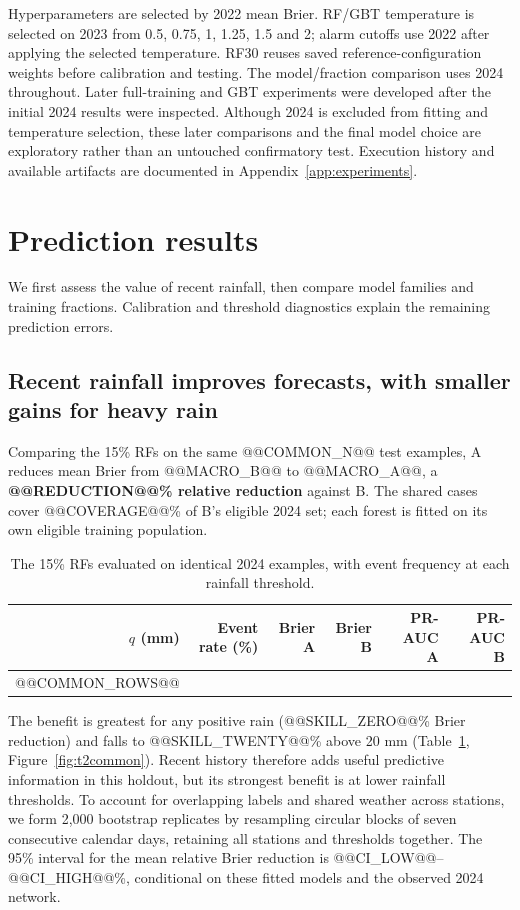Hyperparameters are selected by 2022 mean Brier. RF/GBT temperature is selected on 2023 from 0.5, 0.75, 1, 1.25, 1.5 and 2; alarm cutoffs use 2022 after applying the selected temperature. RF30 reuses saved reference-configuration weights before calibration and testing. The model/fraction comparison uses 2024 throughout. Later full-training and GBT experiments were developed after the initial 2024 results were inspected. Although 2024 is excluded from fitting and temperature selection, these later comparisons and the final model choice are exploratory rather than an untouched confirmatory test. Execution history and available artifacts are documented in Appendix~\ref{app:experiments}.

\clearpage
\section{Prediction results}
We first assess the value of recent rainfall, then compare model families and training fractions. Calibration and threshold diagnostics explain the remaining prediction errors.

\subsection{Recent rainfall improves forecasts, with smaller gains for heavy rain}

Comparing the 15\% RFs on the same @@COMMON_N@@ test examples, A reduces mean Brier from @@MACRO_B@@ to @@MACRO_A@@, a \textbf{@@REDUCTION@@\% relative reduction} against B. The shared cases cover @@COVERAGE@@\% of B's eligible 2024 set; each forest is fitted on its own eligible training population.
\par
\begin{table}[!ht]\centering\small
\begin{tabular}{rrrrrr}\toprule
$q$ (mm) & Event rate (\%) & Brier A & Brier B & PR-AUC A & PR-AUC B\\\midrule
@@COMMON_ROWS@@
\bottomrule
\end{tabular}
\caption{The 15\% RFs evaluated on identical 2024 examples, with event frequency at each rainfall threshold.}\label{tab:t2common}
\end{table}
\par
The benefit is greatest for any positive rain (@@SKILL_ZERO@@\% Brier reduction) and falls to @@SKILL_TWENTY@@\% above 20 mm (Table~\ref{tab:t2common}, Figure~\ref{fig:t2common}). Recent history therefore adds useful predictive information in this holdout, but its strongest benefit is at lower rainfall thresholds.
To account for overlapping labels and shared weather across stations, we form 2,000 bootstrap replicates by resampling circular blocks of seven consecutive calendar days, retaining all stations and thresholds together. The 95\% interval for the mean relative Brier reduction is @@CI_LOW@@--@@CI_HIGH@@\%, conditional on these fitted models and the observed 2024 network.

